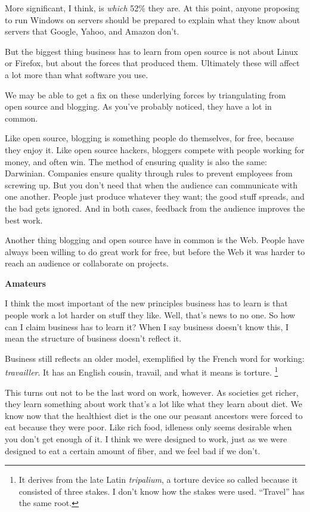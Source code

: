 \documentclass[12pt]{book}
\begin{document}
More significant, I think, is \emph{which} 52\% they are. At this point,
anyone proposing to run Windows on servers should be prepared to explain
what they know about servers that Google, Yahoo, and Amazon don't.

But the biggest thing business has to learn from open source is not
about Linux or Firefox, but about the forces that produced them.
Ultimately these will affect a lot more than what software you use.

We may be able to get a fix on these underlying forces by triangulating
from open source and blogging. As you've probably noticed, they have a
lot in common.

Like open source, blogging is something people do themselves, for free,
because they enjoy it. Like open source hackers, bloggers compete with
people working for money, and often win. The method of ensuring quality
is also the same: Darwinian. Companies ensure quality through rules to
prevent employees from screwing up. But you don't need that when the
audience can communicate with one another. People just produce whatever
they want; the good stuff spreads, and the bad gets ignored. And in both
cases, feedback from the audience improves the best work.

Another thing blogging and open source have in common is the Web. People
have always been willing to do great work for free, but before the Web
it was harder to reach an audience or collaborate on projects.

\textbf{Amateurs}

I think the most important of the new principles business has to learn
is that people work a lot harder on stuff they like. Well, that's news
to no one. So how can I claim business has to learn it? When I say
business doesn't know this, I mean the structure of business doesn't
reflect it.

Business still reflects an older model, exemplified by the French word
for working: \emph{travailler}. It has an English cousin, travail, and
what it means is torture. \footnote{It derives from the late Latin \emph{tripalium}, a torture
device so called because it consisted of three stakes. I don't know how
the stakes were used. ``Travel'' has the same root.}

This turns out not to be the last word on work, however. As societies
get richer, they learn something about work that's a lot like what they
learn about diet. We know now that the healthiest diet is the one our
peasant ancestors were forced to eat because they were poor. Like rich
food, idleness only seems desirable when you don't get enough of it. I
think we were designed to work, just as we were designed to eat a
certain amount of fiber, and we feel bad if we don't.
\end{document}
